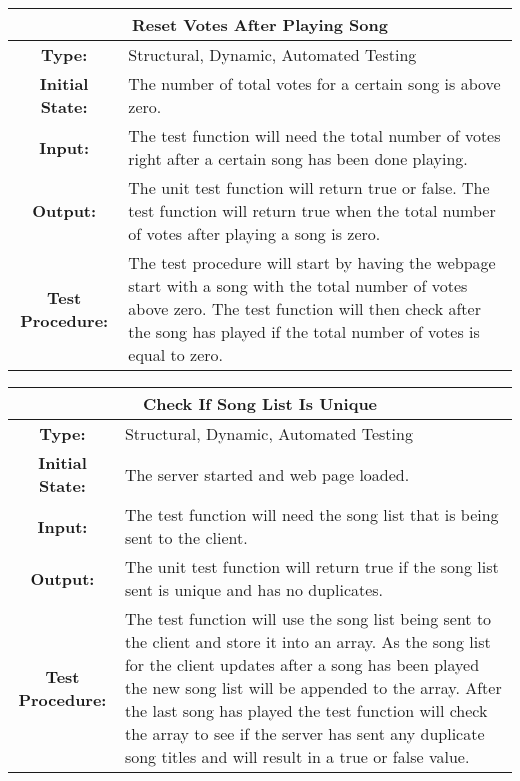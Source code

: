 \documentclass[12pt, titlepage]{article}
\begin{document}
\begin{center}
\begin{table}[H]
\begin{tabularx}{\textwidth}{| c X |}
\hline
\multicolumn{2}{|c|}{\textbf{Reset Votes After Playing Song}}\\
\hline
\textbf{Type: } & Structural, Dynamic, Automated Testing\\

\textbf{Initial State: } & The number of total votes for a certain song is above zero.\\

\textbf{Input: } & The test function will need the total number of votes right after a certain song has been done playing.\\

\textbf{Output: } & The unit test function will return true or false. The test function will return true when the total number of votes after playing a song is zero.\\

\textbf{Test Procedure: } & The test procedure will start by having the webpage start with a song with the total number of votes above zero. The test function will then check after the song has played if the total number of votes is equal to zero. \\
\hline
\end{tabularx}
\end{table}
\end{center}

\begin{center}
\begin{table}[H]
\begin{tabularx}{\textwidth}{| c X |}
\hline
\multicolumn{2}{|c|}{\textbf{Check If Song List Is Unique}}\\
\hline
\textbf{Type: } & Structural, Dynamic, Automated Testing\\

\textbf{Initial State: } & The server started and web page loaded.\\

\textbf{Input: } & The test function will need the song list that is being sent to the client.\\

\textbf{Output: } & The unit test function will return true if the song list sent is unique and has no duplicates.\\

\textbf{Test Procedure: } &The test function will use the song list being sent to the client and store it into an array. As the song list for the client updates after a song has been played the new song list will be appended to the array. After the last song has played the test function will check the array to see if the server has sent any duplicate song titles and will result in a true or false value. \\
\hline
\end{tabularx}
\end{table}
\end{center}
\end{document}
